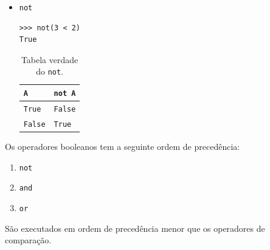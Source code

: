 \begin{itemize}
\item \lstinline+not+ 

\begin{lstlisting}[framexrightmargin=-2.5em]
>>> not(3 < 2)
True
\end{lstlisting}

  \begin{table}[H]
    \centering
    \caption{Tabela verdade do \lstinline+not+.}
    \begin{tabular}{l|l}
      {\lstinline+A+}     & {\lstinline+not A+} \\\hline
      {\lstinline+True+}  & {\lstinline+False+} \\
      {\lstinline+False+} & {\lstinline+True+} \\\hline
    \end{tabular}
  \end{table}  
\end{itemize}

\begin{obs}
  Os operadores booleanos tem a seguinte ordem de precedência:
  \begin{enumerate}[1.]
  \item \lstinline+not+
  \item \lstinline+and+
  \item \lstinline+or+
  \end{enumerate}
  São executados em ordem de precedência menor que os operadores de comparação.
\end{obs}

